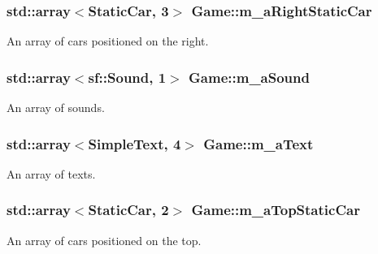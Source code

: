 \subsubsection[{\texorpdfstring{m\+\_\+a\+Right\+Static\+Car}{m_aRightStaticCar}}]{\setlength{\rightskip}{0pt plus 5cm}std\+::array$<${\bf Static\+Car}, 3$>$ Game\+::m\+\_\+a\+Right\+Static\+Car\hspace{0.3cm}{\ttfamily [private]}}\hypertarget{class_game_a53199784b896c76c8b6fc7663f92b334}{}\label{class_game_a53199784b896c76c8b6fc7663f92b334}
An array of cars positioned on the right. 
\subsubsection[{\texorpdfstring{m\+\_\+a\+Sound}{m_aSound}}]{\setlength{\rightskip}{0pt plus 5cm}std\+::array$<$sf\+::\+Sound, 1$>$ Game\+::m\+\_\+a\+Sound\hspace{0.3cm}{\ttfamily [private]}}\hypertarget{class_game_a9bbec66f60fb732629222dd90ba62778}{}\label{class_game_a9bbec66f60fb732629222dd90ba62778}
An array of sounds. 
\subsubsection[{\texorpdfstring{m\+\_\+a\+Text}{m_aText}}]{\setlength{\rightskip}{0pt plus 5cm}std\+::array$<${\bf Simple\+Text}, 4$>$ Game\+::m\+\_\+a\+Text\hspace{0.3cm}{\ttfamily [private]}}\hypertarget{class_game_a8a9e4f882c541075d13cad25ea2aec08}{}\label{class_game_a8a9e4f882c541075d13cad25ea2aec08}
An array of texts. 
\subsubsection[{\texorpdfstring{m\+\_\+a\+Top\+Static\+Car}{m_aTopStaticCar}}]{\setlength{\rightskip}{0pt plus 5cm}std\+::array$<${\bf Static\+Car}, 2$>$ Game\+::m\+\_\+a\+Top\+Static\+Car\hspace{0.3cm}{\ttfamily [private]}}\hypertarget{class_game_ac8205b8f1930f12fd4fdd71ab575bbdf}{}\label{class_game_ac8205b8f1930f12fd4fdd71ab575bbdf}
An array of cars positioned on the top. 
